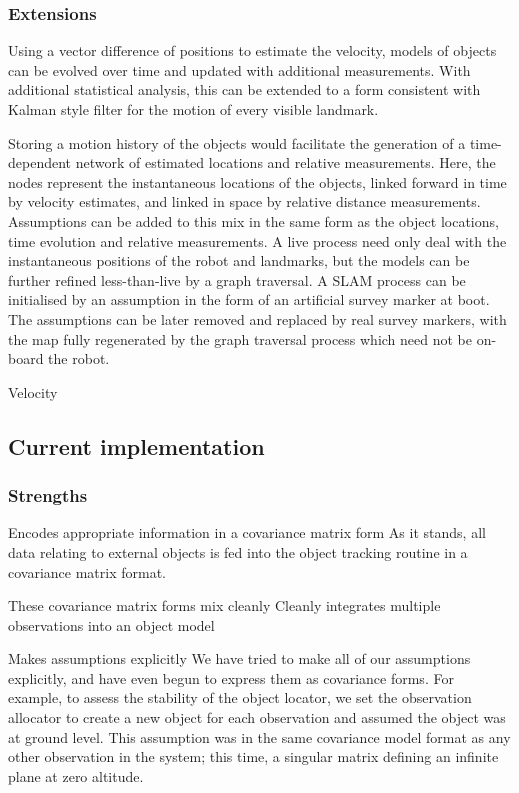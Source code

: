 \documentclass[a4paper, 11pt, titlepage]{article}
\begin{document}
    \subsubsection{Extensions}
      Using a vector difference of positions to estimate the velocity, models of objects can be evolved over time and updated with additional measurements.  With additional statistical analysis, this can be extended to a form consistent with Kalman style filter for the motion of every visible landmark.

      Storing a motion history of the objects would facilitate the generation of a time-dependent network of estimated locations and relative measurements.
      Here, the nodes represent the instantaneous locations of the objects, linked forward in time by velocity estimates, and linked in space by relative distance measurements.  Assumptions can be added to this mix in the same form as the object locations, time evolution and relative measurements.  A live process need only deal with the instantaneous positions of the robot and landmarks, but the models can be further refined less-than-live by a graph traversal.
      A SLAM process can be initialised by an assumption in the form of an artificial survey marker at boot. The assumptions can be later removed and replaced by real survey markers, with the map fully regenerated by the graph traversal process which need not be on-board the robot.
      
      Velocity

  \subsection{Current implementation}
    \subsubsection{Strengths}
      
      Encodes appropriate information in a covariance matrix form
      As it stands, all data relating to external objects is fed into the object tracking routine in a covariance matrix format.  

      These covariance matrix forms mix cleanly 
      Cleanly integrates multiple observations into an object model

      Makes assumptions explicitly
      We have tried to make all of our assumptions explicitly, and have even begun to express them as covariance forms.
      For example, to assess the stability of the object locator, we set the observation allocator to create a new object for each observation and assumed the object was at ground level.  This assumption was in the same covariance model format as any other observation in the system; this time, a singular matrix defining an infinite plane at zero altitude.
\end{document}
